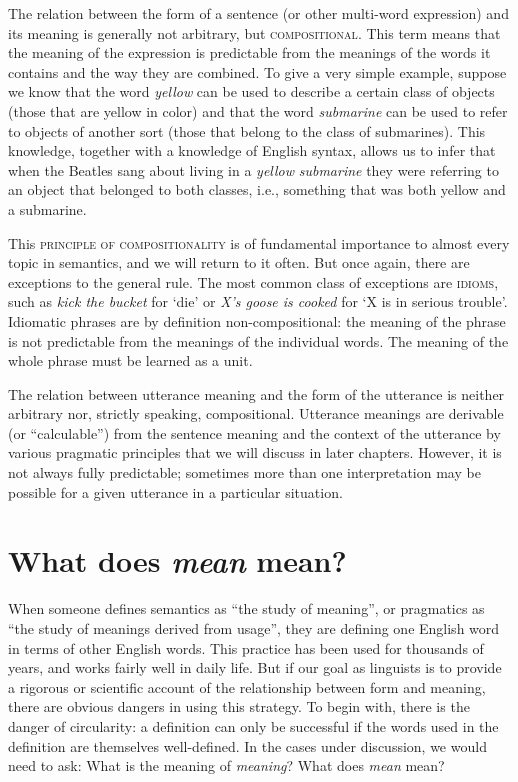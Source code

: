 The relation between the form of a sentence (or other multi-word expression) and its meaning is generally not arbitrary, but \textsc{compositional}. This term means that the meaning of the expression is predictable from the meanings of the words it contains and the way they are combined. To give a very simple example, suppose we know that the word \textit{yellow} can be used to describe a certain class of objects (those that are yellow in color) and that the word \textit{submarine} can be used to refer to objects of another sort (those that belong to the class of submarines). This knowledge, together with a knowledge of English syntax, allows us to infer that when the Beatles sang about living in a \textit{yellow} \textit{submarine} they were referring to an object that belonged to both classes, i.e., something that was both yellow and a submarine.



This \textsc{principle of compositionality} is of fundamental importance to almost every topic in semantics, and we will return to it often. But once again, there are exceptions to the general rule. The most common class of exceptions are \textsc{idioms}, such as \textit{kick the bucket} for ‘die’ or \textit{X’s goose is cooked} for ‘X is in serious trouble’. Idiomatic phrases are by definition non-compositional: the meaning of the phrase is not predictable from the meanings of the individual words. The meaning of the whole phrase must be learned as a unit.



The relation between utterance meaning and the form of the utterance is neither arbitrary nor, strictly speaking, compositional. Utterance meanings are derivable (or “calculable”) from the sentence meaning and the context of the utterance by various pragmatic principles that we will discuss in later chapters. However, it is not always fully predictable; sometimes more than one interpretation may be possible for a given utterance in a particular situation.


\section{What does \textit{mean} mean?}\label{sec:1.4}

When someone defines semantics as “the study of meaning”, or pragmatics as “the study of meanings derived from usage”, they are defining one English word in terms of other English words. This practice has been used for thousands of years, and works fairly well in daily life. But if our goal as linguists is to provide a rigorous or scientific account of the relationship between form and meaning, there are obvious dangers in using this strategy. To begin with, there is the danger of circularity: a definition can only be successful if the words used in the definition are themselves well-defined. In the cases under discussion, we would need to ask: What is the meaning of \textit{meaning}? What does \textit{mean} mean?



